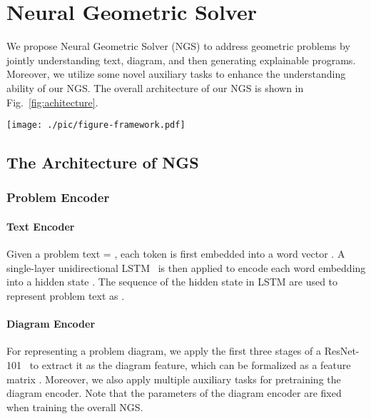 \documentclass[11pt,a4paper]{article}
\begin{document}
\section{Neural Geometric Solver}
We propose Neural Geometric Solver (NGS) to address geometric problems by jointly understanding text, diagram, and then generating explainable programs. Moreover, we utilize some novel auxiliary tasks to enhance the understanding ability of our NGS.
The overall architecture of our NGS is shown in Fig.~\ref{fig:achitecture}. 





\begin{figure*}[t]
\begin{center}
 \texttt{[image: ./pic/figure-framework.pdf]}
\end{center}
  \caption{The overall architecture of our Neural Geometric Solver (left) in conjunction with auxiliary tasks (right). The problem text and diagram is encoded separately, then fed into a joint reasoning module together to obtain cross-modal fusion of text and diagram features. A decoder utilizes fused multimodal features to generate the interpretable programs. In addition, we propose three auxiliary tasks to enhance feature representation and facilitate multimodal reasoning.
}
\label{fig:achitecture}
\end{figure*}

\subsection{The Architecture of NGS}

\subsubsection{Problem Encoder}
\paragraph{Text Encoder}
Given a problem text  = , each token  is first embedded into a word vector . A single-layer unidirectional LSTM~\cite{LSTM} is then applied to encode each word embedding  into a hidden state . The sequence of the hidden state in LSTM are used to represent problem text  as .



\paragraph{Diagram Encoder}
For representing a problem diagram, we apply the first three stages of a ResNet-101~\cite{he2016deep}  to extract it as the diagram feature, which can be formalized as a feature matrix   .
Moreover, we also apply multiple auxiliary tasks for pretraining the diagram encoder.
Note that the parameters of the diagram encoder are fixed when training the overall NGS.
\end{document}
